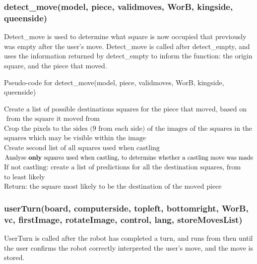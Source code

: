 \documentclass[onecolumn]{IEEEtran}
\begin{document}
\subsubsection{detect\_move(model, piece, validmoves, WorB, kingside, queenside)}
Detect\_move is used to determine what square is now occupied that previously was empty after the user's move. Detect\_move is called after detect\_empty, and uses the information returned by detect\_empty to inform the function: the origin square, and the piece that moved.

\begin{algorithm}[H]
\caption{Pseudo-code for detect\_move(model, piece, validmoves, WorB, kingside, queenside)}
\begin{algorithmic}[1]
\STATE $\text{Create a list of possible destinations squares for the piece that moved, based on the legal moves of that piece}$
\STATEx $\text{ from the square it moved from}$
\STATE $\text{Crop the pixels to the sides (9 from each side) of the images of the squares in the above list, to avoid any other}$
\STATEx $\text{squares which may be visible within the image}$
\STATE $\text{Create second list of all squares used when castling}$
\STATE $\text{Analyse \textbf{only} squares used when castling, to determine whether a castling move was made}$
\STATE $\text{If not castling: create a list of predictions for all the destination squares, from most likely to be moved to}$
\STATEx $\text{to least likely}$
\STATE $\text{Return: the square most likely to be the destination of the moved piece}$
\end{algorithmic}
\end{algorithm}

\subsubsection{userTurn(board, computerside, topleft, bottomright, WorB, vc, firstImage, rotateImage, control, lang, storeMovesList)}
UserTurn is called after the robot has completed a turn, and runs from then until the user confirms the robot correctly interpreted the user's move, and the move is stored. 
\end{document}
